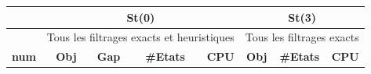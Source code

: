 \begin{table}[H]
	\centering
	\small
	\begin{tabular}{|r|rrrr|rrr|}
		\toprule
		\hline
		\rowcolor{cyan}	&\multicolumn{4}{c|}{\textbf{St(0)}} & \multicolumn{3}{c|}{\textbf{St(3)}}\\ \hline
		\midrule
			\hline
		\rowcolor{cyan}	&\multicolumn{4}{c|}{ \scriptsize{Tous les filtrages exacts et heuristiques}} & \multicolumn{3}{c|}{\scriptsize{Tous les filtrages exacts}}
		\\ \hline
		\midrule
	
		\rowcolor{cyan}	\textbf{num} &\textbf{Obj} & \textbf{Gap} & \textbf{\#Etats} & \textbf{CPU} &\textbf{Obj} & \textbf{\#Etats} & \textbf{CPU}   \\ \hline
		\midrule
		

\end{tabular}
\end{table}

